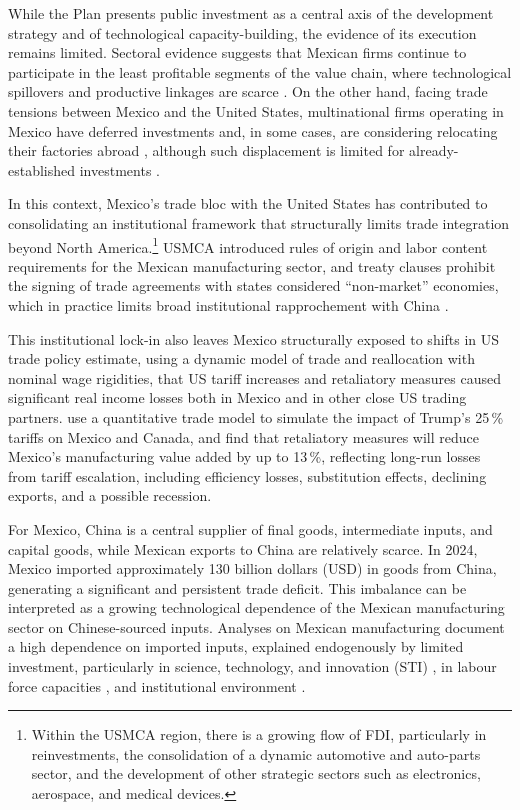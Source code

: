 \documentclass[11pt]{article}
\begin{document}
While the Plan presents public investment as a central axis of the
development strategy and of technological capacity-building, the evidence
of its execution remains limited. Sectoral evidence suggests that Mexican
firms continue to participate in the least profitable segments of the value chain,
where technological spillovers and productive linkages are scarce
\citep{Sandoval2019,Basave2023,Basave2024,SandovalDuarte2025}.
On the other hand, facing trade tensions between Mexico and the United States, multinational firms operating in Mexico have deferred
investments and, in some cases, are considering relocating their
factories abroad \citep{Ando2024}, although such displacement is limited
for already-established investments \citep{Shih2020,Zhai2024}.

In this context, Mexico's trade bloc with the United States has
contributed to consolidating an institutional framework that structurally
limits trade integration beyond North America.\footnote{Within the USMCA region, there is a growing flow of
FDI, particularly in reinvestments, the consolidation of a dynamic
automotive and auto-parts sector, and the development of other strategic
sectors such as electronics, aerospace, and medical devices.} USMCA
introduced rules of origin and labor content requirements for the
Mexican manufacturing sector, and treaty clauses prohibit the signing of
trade agreements with states considered ``non-market'' economies, which in practice limits broad institutional rapprochement with China 
\citep{GomezRuiz2021}. 

This institutional lock-in also leaves Mexico structurally exposed to shifts in US trade policy \citet{RodriguezClare2025} estimate, using a dynamic model of trade and
reallocation with nominal wage rigidities, that US tariff increases and
retaliatory measures caused significant real income losses both in Mexico
and in other close US trading partners. \citet{FlachBaur2025} use a
quantitative trade model to simulate the impact of Trump's 25\,\% tariffs
on Mexico and Canada, and find that retaliatory measures will reduce
Mexico's manufacturing value added by up to 13\,\%, reflecting long-run
losses from tariff escalation, including efficiency losses, substitution
effects, declining exports, and a possible recession.

For Mexico, China is a central supplier of final goods, intermediate
inputs, and capital goods, while Mexican exports to China are relatively
scarce. In 2024, Mexico imported approximately 130 billion dollars (USD)
in goods from China, generating a significant and persistent trade
deficit. This imbalance can be interpreted as a growing technological
dependence of the Mexican manufacturing sector on Chinese-sourced inputs\citep{PerezSantilla2024}.
Analyses on Mexican manufacturing document a high
dependence on imported inputs, explained
endogenously by limited investment, particularly in science, technology,
and innovation (STI) \citep{Basave2024}, in labour force capacities
\citep{Basave2023}, and institutional environment \citep{KehoeXu2025}. 
\end{document}
